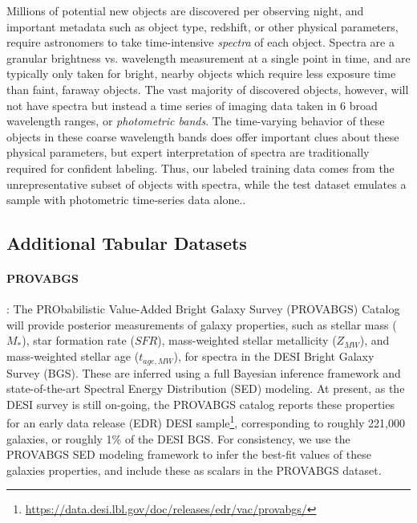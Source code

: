Millions of potential new objects are discovered per observing night, and important metadata such as object type, redshift, or other physical parameters, require astronomers to take time-intensive \textit{spectra} of each object. Spectra are a granular brightness vs. wavelength measurement at a single point in time, and are typically only taken for bright, nearby objects which require less exposure time than faint, faraway objects. The vast majority of discovered objects, however, will not have spectra but instead a time series of imaging data taken in 6 broad wavelength ranges, or \textit{photometric bands}. The time-varying behavior of these objects in these coarse wavelength bands does offer important clues about these physical parameters, but expert interpretation of spectra are traditionally required for confident labeling. Thus, our labeled training data comes from the unrepresentative subset of objects with spectra, while the test dataset emulates a sample with photometric time-series data alone.. 

\subsection{Additional Tabular Datasets}

\paragraph{PROVABGS}: The PRObabilistic Value-Added Bright Galaxy Survey (PROVABGS) Catalog \cite{Hahn_2023} will provide posterior measurements of galaxy properties, such as stellar mass ($M_*$), star formation rate ($SFR$), mass-weighted stellar metallicity ($Z_{MW}$), and mass-weighted stellar age ($t_{age,MW}$), for spectra in the DESI Bright Galaxy Survey (BGS). These are inferred using a full Bayesian inference framework and state-of-the-art Spectral Energy Distribution (SED) modeling. At present, as the DESI survey is still on-going, the PROVABGS catalog reports these properties for an early data release (EDR) DESI sample\footnote{\url{https://data.desi.lbl.gov/doc/releases/edr/vac/provabgs/}}, corresponding to roughly 221,000 galaxies, or roughly 1\% of the DESI BGS. For consistency, we use the PROVABGS SED modeling framework to infer the best-fit values of these galaxies properties, and include these as scalars in the PROVABGS dataset. 

